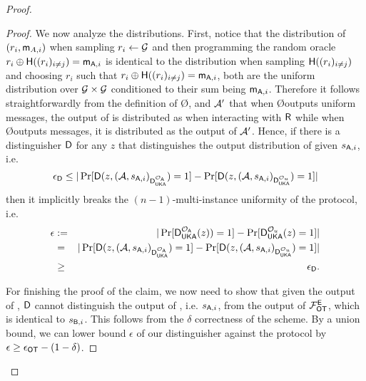 \begin{proof}
\begin{proof}
We now analyze the distributions. 
First, notice that the distribution of $(r_i,\mathsf{m}_{A,i})$ when sampling $r_i\leftarrow\mathcal{G}$ and then programming the random oracle $r_i\oplus\mathsf{H}((r_i)_{i\neq j})=\mathsf{m}_{\mathsf{A},i}$ is identical to the distribution when sampling $\mathsf{H}((r_i)_{i\neq j})$ and choosing $r_i$  such that $r_i\oplus\mathsf{H}((r_i)_{i\neq j})=\mathsf{m}_{\mathsf{A},i}$, both are the uniform distribution over $\mathcal{G}\times\mathcal{G}$ conditioned to their sum being $\mathsf{m}_{\mathsf{A},i}$. Therefore it follows straightforwardly from the definition of \O, \rec and $\mathcal{A}'$ that when \O outputs uniform messages, the output of \Adv is distributed as when interacting with $\mathsf{R}$ while when \O outputs \UKA messages, it is distributed as the output of $\mathcal{A}'$. Hence, if there is a distinguisher $\mathsf D$ for any $z$ that distinguishes the output distribution of \Adv given $s_{\mathsf{A},i}$, i.e.
$$
\epsilon_{\mathsf D}\leq |\Pr[\mathsf D(z,(\mathcal{A},s_{\mathsf{A},i})_{\mathsf D_{\mathsf{UKA}}^{\mathcal{O}_\mathsf{A}}})=1]-\Pr[\mathsf D(z,(\mathcal{A},s_{\mathsf{A},i})_{\mathsf D_{\mathsf{UKA}}^{\mathcal{O}_u}})=1]|
$$
then it implicitly breaks the $(n-1)$-multi-instance uniformity of the \UKA protocol, i.e. 
\begin{eqnarray*}
\epsilon&:=& |\Pr[\mathsf D_{\mathsf{UKA}}^{\mathcal{O}_{\mathsf{A}}}(z))=1] -\Pr[ \mathsf D_{\mathsf{UKA}}^{\mathcal{O}_u}(z)=1]|\\
&=&|\Pr[\mathsf D(z,(\mathcal{A},s_{\mathsf{A},i})_{\mathsf D_{\mathsf{UKA}}^{\mathcal{O}_{\mathsf{A}}}})=1] -\Pr[ \mathsf D(z,(\mathcal{A},s_{\mathsf{A},i})_{\mathsf D_{\mathsf{UKA}}^{\mathcal{O}_{u}}})=1]|\\
&\geq & \epsilon_{\mathsf D}.
\end{eqnarray*}

For finishing the proof of the claim, we now need to show that given the output of \Adv, $\mathsf D$ cannot distinguish the output of \rec, i.e. $s_{\mathsf{A},i}$,  from the output of $\mathcal{F}_{\mathsf{OT}}^\mathsf{E}$, which is identical to $s_{\mathsf{B},i}$. This follows from the $\delta$ correctness of the \UKA scheme. By a union bound, 
% 
% 
% 
 we can lower bound $\epsilon$ of our distinguisher against the \UKA protocol by $\epsilon\geq\epsilon_{\mathsf{OT}}-(1-\delta)$.
\pe
\end{proof}


\end{proof}
